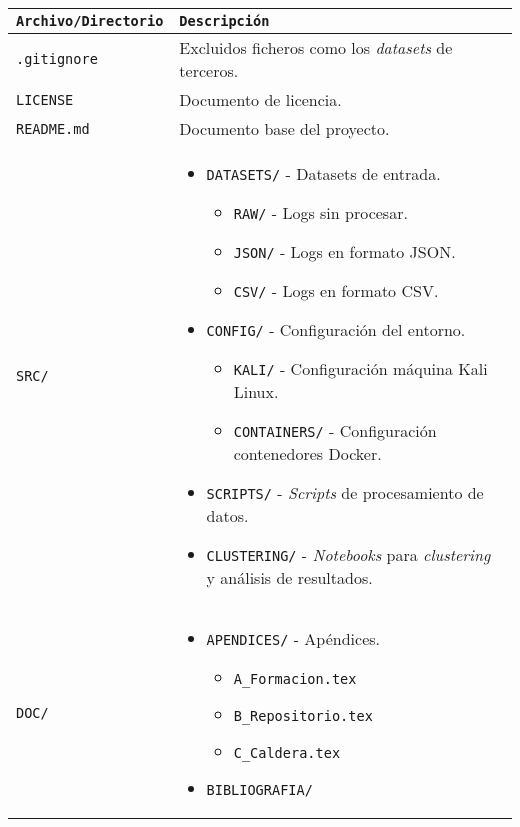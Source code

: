 \begin{table}[H]
\centering
\scriptsize
\begin{tabularx}{\textwidth}{|>{\raggedright\arraybackslash}p{3cm}|>{\raggedright\arraybackslash}X|}
\hline
\rowcolor{graylight}\texttt{Archivo/Directorio} & \texttt{Descripción} \\
\hline
\texttt{.gitignore} & Excluidos ficheros como los \textit{datasets} de terceros. \\
\hline
\texttt{LICENSE} & Documento de licencia. \\
\hline
\texttt{README.md} & Documento base del proyecto. \\
\hline
\texttt{SRC/} & 
\begin{itemize}
    \item \texttt{DATASETS/} - Datasets de entrada.
    \begin{itemize}
        \item \texttt{RAW/} - Logs sin procesar.
        \item \texttt{JSON/} - Logs en formato JSON.
        \item \texttt{CSV/} - Logs en formato CSV.
    \end{itemize}
    \item \texttt{CONFIG/} - Configuración del entorno.
    \begin{itemize}
        \item \texttt{KALI/} - Configuración máquina Kali Linux.
        \item \texttt{CONTAINERS/} - Configuración contenedores Docker.
    \end{itemize}
    \item \texttt{SCRIPTS/} - \textit{Scripts} de procesamiento de datos.
    \item \texttt{CLUSTERING/} - \textit{Notebooks} para \textit{clustering} y análisis de resultados.
\end{itemize} \\
\hline
\texttt{DOC/} & 
\begin{itemize}
    \item \texttt{APENDICES/} - Apéndices.
    \begin{itemize}
        \item \texttt{A\_Formacion.tex}
        \item \texttt{B\_Repositorio.tex}
        \item \texttt{C\_Caldera.tex}
    \end{itemize}
    \item \texttt{BIBLIOGRAFIA/}

\end{itemize}
\end{tabularx}
\end{table}
